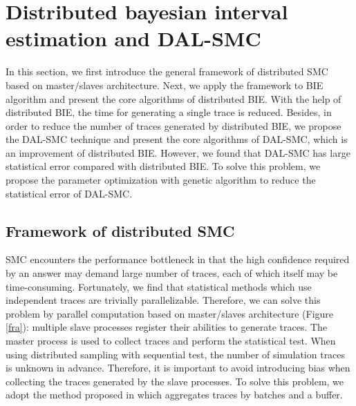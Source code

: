 \section{Distributed bayesian interval estimation and DAL-SMC}

In this section, we first introduce the general framework of distributed SMC based on master/slaves architecture. Next, we apply the framework to BIE algorithm and present the core algorithms of distributed BIE. With the help of distributed BIE, the time for generating a single trace is reduced. Besides, in order to reduce the number of traces generated by distributed BIE, we propose the DAL-SMC technique and present the core algorithms of DAL-SMC, which is an improvement of distributed BIE. However, we found that DAL-SMC has large statistical error compared with distributed BIE. To solve this problem, we propose the parameter optimization with genetic algorithm to reduce the statistical error of DAL-SMC.

\subsection{Framework of distributed SMC}

SMC encounters the performance bottleneck in that the high confidence required by an answer may demand large number of traces, each of which itself may be time-consuming. Fortunately, we find that statistical methods which use independent traces are trivially parallelizable. Therefore, we can solve this problem by parallel computation based on master/slaves architecture (Figure \ref{fra}): multiple slave processes register their abilities to generate traces. The master process is used to collect traces and perform the statistical test. When using distributed sampling with sequential test, the number of simulation traces is unknown in advance. Therefore, it is important to avoid introducing bias when collecting the traces generated by the slave processes. To solve this problem, we adopt the method proposed in \cite{Bulychev2012Checking} which aggregates traces by batches and a buffer.

